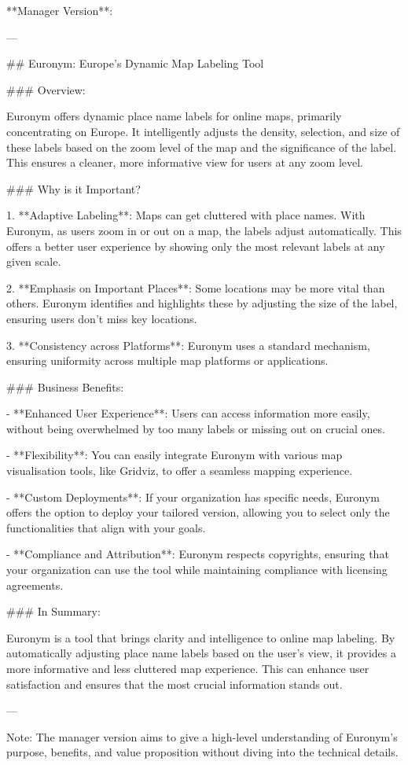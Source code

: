 **Manager Version**:

---

## Euronym: Europe's Dynamic Map Labeling Tool

### Overview:

Euronym offers dynamic place name labels for online maps, primarily concentrating on Europe. It intelligently adjusts the density, selection, and size of these labels based on the zoom level of the map and the significance of the label. This ensures a cleaner, more informative view for users at any zoom level.

### Why is it Important?

1. **Adaptive Labeling**: Maps can get cluttered with place names. With Euronym, as users zoom in or out on a map, the labels adjust automatically. This offers a better user experience by showing only the most relevant labels at any given scale.
   
2. **Emphasis on Important Places**: Some locations may be more vital than others. Euronym identifies and highlights these by adjusting the size of the label, ensuring users don't miss key locations.
   
3. **Consistency across Platforms**: Euronym uses a standard mechanism, ensuring uniformity across multiple map platforms or applications.

### Business Benefits:

- **Enhanced User Experience**: Users can access information more easily, without being overwhelmed by too many labels or missing out on crucial ones.

- **Flexibility**: You can easily integrate Euronym with various map visualisation tools, like Gridviz, to offer a seamless mapping experience.

- **Custom Deployments**: If your organization has specific needs, Euronym offers the option to deploy your tailored version, allowing you to select only the functionalities that align with your goals.

- **Compliance and Attribution**: Euronym respects copyrights, ensuring that your organization can use the tool while maintaining compliance with licensing agreements.

### In Summary:

Euronym is a tool that brings clarity and intelligence to online map labeling. By automatically adjusting place name labels based on the user's view, it provides a more informative and less cluttered map experience. This can enhance user satisfaction and ensures that the most crucial information stands out.

---

Note: The manager version aims to give a high-level understanding of Euronym's purpose, benefits, and value proposition without diving into the technical details.